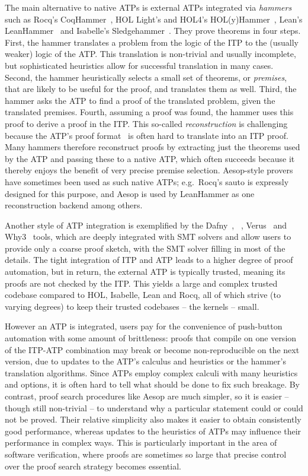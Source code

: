 The main alternative to native ATPs is external ATPs integrated via \emph{hammers} such as Rocq's CoqHammer~\cite{CoqHammer}, HOL Light's and HOL4's HOL(y)Hammer~\cite{HOLyHammer,HOLyHammerHOL4}, Lean's LeanHammer~\cite{LeanHammer} and Isabelle's Sledgehammer~\cite{Sledgehammer}.
They prove theorems in four steps.
First, the hammer translates a problem from the logic of the ITP to the (usually weaker) logic of the ATP.
This translation is non-trivial and usually incomplete, but sophisticated heuristics allow for successful translation in many cases.
Second, the hammer heuristically selects a small set of theorems, or \emph{premises}, that are likely to be useful for the proof, and translates them as well.
Third, the hammer asks the ATP to find a proof of the translated problem, given the translated premises.
Fourth, assuming a proof was found, the hammer uses this proof to derive a proof in the ITP.
This so-called \emph{reconstruction} is challenging because the ATP's proof format~\cite{Alethe,CVC5ProofVerification,CVC5RewriteVerification} is often hard to translate into an ITP proof.
Many hammers therefore reconstruct proofs by extracting just the theorems used by the ATP and passing these to a native ATP, which often succeeds because it thereby enjoys the benefit of very precise premise selection.
Aesop-style provers have sometimes been used as such native ATPs; e.g.\ Rocq's sauto is expressly designed for this purpose, and Aesop is used by LeanHammer as one reconstruction backend among others.

Another style of ATP integration is exemplified by the Dafny~\cite{Dafny}, \Fstar~\cite{Fstar}, Verus~\cite{Verus} and Why3~\cite{Why3} tools, which are deeply integrated with SMT solvers and allow users to provide only a coarse proof sketch, with the SMT solver filling in most of the details.
The tight integration of ITP and ATP leads to a higher degree of proof automation, but in return, the external ATP is typically trusted, meaning its proofs are not checked by the ITP.
This yields a large and complex trusted codebase compared to HOL, Isabelle, Lean and Rocq, all of which strive (to varying degrees) to keep their trusted codebases -- the kernels -- small.

However an ATP is integrated, users pay for the convenience of push-button automation with some amount of brittleness: proofs that compile on one version of the ITP-ATP combination may break or become non-reproducible on the next version, due to updates to the ATP's calculus and heuristics or the hammer's translation algorithms.
Since ATPs employ complex calculi with many heuristics and options, it is often hard to tell what should be done to fix such breakage.
By contrast, proof search procedures like Aesop are much simpler, so it is easier -- though still non-trivial -- to understand why a particular statement could or could not be proved.
Their relative simplicity also makes it easier to obtain consistently good performance, whereas updates to the heuristics of ATPs may influence their performance in complex ways.
This is particularly important in the area of software verification, where proofs are sometimes so large that precise control over the proof search strategy becomes essential.

